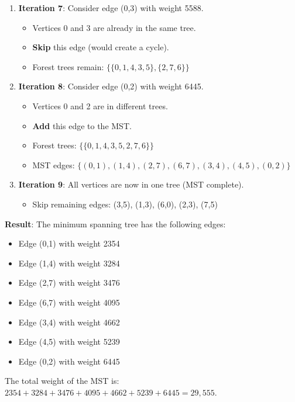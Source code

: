 \documentclass{article}
\theoremstyle{definition}
\begin{document}
\begin{enumerate}
\item \textbf{Iteration 7}: Consider edge (0,3) with weight 5588.
   \begin{itemize}
   \item Vertices 0 and 3 are already in the same tree.
   \item \textbf{Skip} this edge (would create a cycle).
   \item Forest trees remain: $\{\{0,1,4,3,5\}, \{2,7,6\}\}$
   \end{itemize}

\item \textbf{Iteration 8}: Consider edge (0,2) with weight 6445.
   \begin{itemize}
   \item Vertices 0 and 2 are in different trees.
   \item \textbf{Add} this edge to the MST.
   \item Forest trees: $\{\{0,1,4,3,5,2,7,6\}\}$
   \item MST edges: $\{(0,1), (1,4), (2,7), (6,7), (3,4), (4,5), (0,2)\}$
   \end{itemize}

\item \textbf{Iteration 9}: All vertices are now in one tree (MST complete).
   \begin{itemize}
   \item Skip remaining edges: (3,5), (1,3), (6,0), (2,3), (7,5)
   \end{itemize}
\end{enumerate}

\noindent\textbf{Result}: The minimum spanning tree has the following edges:
\begin{itemize}
\item Edge (0,1) with weight 2354
\item Edge (1,4) with weight 3284
\item Edge (2,7) with weight 3476
\item Edge (6,7) with weight 4095
\item Edge (3,4) with weight 4662
\item Edge (4,5) with weight 5239
\item Edge (0,2) with weight 6445
\end{itemize}

\noindent The total weight of the MST is: $2354 + 3284 + 3476 + 4095 + 4662 + 5239 + 6445 = 29,555$.
\end{document}
